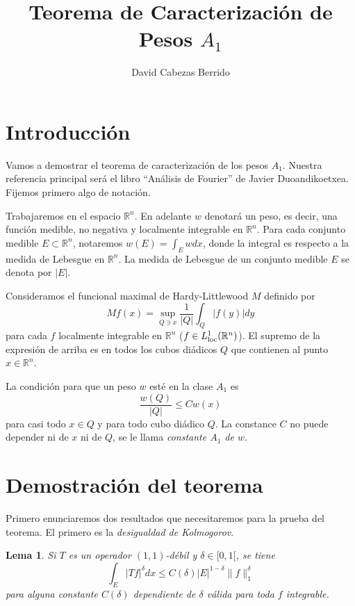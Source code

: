 \documentclass[12pt,english]{article}
\title{Teorema de Caracterización de Pesos $A_1$}
\author{David Cabezas Berrido}
\date{}
\newtheorem{lemma}[theorem]{Lema}
\theoremstyle{definition}
\theoremstyle{remark}
\begin{document}
\maketitle

\section*{Introducción}

Vamos a demostrar el teorema de caracterización de los pesos $A_1$. Nuestra referencia principal será el libro ``Análisis de Fourier'' de Javier Duoandikoetxea. Fijemos primero algo de notación.

Trabajaremos en el espacio $\mathbb{R}^n$. En adelante $w$ denotará un peso, es decir, una función medible, no negativa y localmente integrable en $\mathbb{R}^n$. Para cada conjunto medible $E\subset \mathbb{R}^n$, notaremos $w(E)=\int_E w dx$, donde la integral es respecto a la medida de Lebesgue en $\mathbb{R}^n$. La medida de Lebesgue de un conjunto medible $E$ se denota por $|E|$.

Consideramos el funcional maximal de Hardy-Littlewood $M$ definido por
\begin{equation}\label{eq: H-L}
Mf(x)=\sup_{Q\ni x}\frac{1}{|Q|}\int_Q|f(y)|dy
\end{equation}
para cada $f$ localmente integrable en $\mathbb{R}^n$ \big($f\in L^1_{\rm loc}(\mathbb{R}^n)$\big). El supremo de la expresión de arriba es en todos los cubos diádicos $Q$ que contienen al punto $x\in\mathbb{R}^n$.

La condición para que un peso $w$ esté en la clase $A_1$ es
\begin{equation}\label{eq: A1}
\frac{w(Q)}{|Q|}\leq C w(x) 
\end{equation}
para casi todo $x\in Q$ y para todo cubo diádico $Q$. La constance $C$ no puede depender ni de $x$ ni de $Q$, se le llama \emph{constante $A_1$ de $w$}.

\section*{Demostración del teorema}

Primero enunciaremos dos resultados que necesitaremos para la prueba del teorema. El primero es la \emph{desigualdad de Kolmogorov}.

\begin{lemma} \label{lm: kolmogorov} Si $T$ es un operador $(1,1)$-débil y $\delta\in [0,1[$, se tiene
	\[\int_E |Tf|^\delta dx\leq C(\delta) |E|^{1-\delta}\|f\|_{1}^\delta\]
	para alguna constante $C(\delta)$ dependiente de $\delta$ válida para toda $f$ integrable.
\end{lemma}
\end{document}

